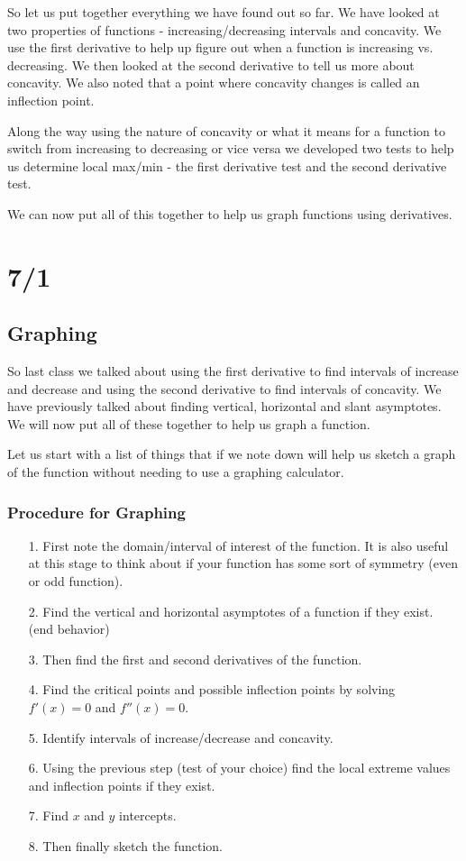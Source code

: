 \documentclass[12pt,reqno]{article}
\theoremstyle{definition}
\begin{document}
So let us put together everything we have found out so far. We have looked at two properties of functions - increasing/decreasing intervals and concavity. We use the first derivative to help up figure out when a function is increasing vs. decreasing. We then looked at the second derivative to tell us more about concavity. We also noted that a point where concavity changes is called an inflection point. 

Along the way using the nature of concavity or what it means for a function to switch from increasing to decreasing or vice versa we developed two tests to help us determine local max/min - the first derivative test and the second derivative test.

We can now put all of this together to help us graph functions using derivatives. 


\section{7/1}

\subsection{Graphing}
So last class we talked about using the first derivative to find intervals of increase and decrease and using the second derivative to find intervals of concavity. We have previously talked about finding vertical, horizontal and slant asymptotes. We will now put all of these together to help us graph a function. 

Let us start with a list of things that if we note down will help us sketch a graph of the function without needing to use a graphing calculator. 

\subsubsection{Procedure for Graphing}
\begin{itemize}
	\item[1.] First note the domain/interval of interest of the function. It is also useful at this stage to think about if your function has some sort of symmetry (even or odd function). 
	\item[2.] Find the vertical and horizontal asymptotes of a function if they exist. (end behavior)
	\item[3.] Then find the first and second derivatives of the function. 
	\item[4.] Find the critical points and possible inflection points by solving $f'(x) = 0$ and $f''(x) = 0$. 
	\item[5.] Identify intervals of increase/decrease and concavity. 
	\item[6.] Using the previous step (test of your choice) find the local extreme values and inflection points if they exist. 
	\item[7.] Find $x$ and $y$ intercepts. 
	\item[8.] Then finally sketch the function. 
\end{itemize}
\end{document}
